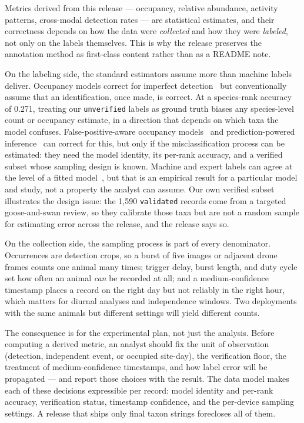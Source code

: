 \documentclass[sigconf]{acmart}
\begin{document}
Metrics derived from this release --- occupancy, relative abundance,
activity patterns, cross-modal detection rates --- are statistical
estimates, and their correctness depends on how the data were
\emph{collected} and how they were \emph{labeled}, not only on the
labels themselves. This is why the release preserves the annotation
method as first-class content rather than as a README note.

On the labeling side, the standard estimators assume more than machine
labels deliver. Occupancy models correct for imperfect
detection~\cite{mackenzie2002occupancy} but conventionally assume that
an identification, once made, is correct. At a species-rank accuracy of
0.271, treating our \texttt{unverified} labels as ground truth biases
any species-level count or occupancy estimate, in a direction that
depends on which taxa the model confuses. False-positive-aware occupancy
models~\cite{royle2006falsepositive,chambert2015falsepositive} and
prediction-powered inference~\cite{angelopoulos2023ppi} can correct
for this, but only if the misclassification process can be estimated:
they need the model identity, its per-rank accuracy, and a verified
subset whose sampling design is known. Machine and expert labels can
agree at the level of a fitted model~\cite{Thornton2026AI}, but that is
an empirical result for a particular model and study, not a property
the analyst can assume. Our own verified subset illustrates the design
issue: the 1{,}590 \texttt{validated} records come from a targeted
goose-and-swan review, so they calibrate those taxa but are not a random
sample for estimating error across the release, and the release says
so.

On the collection side, the sampling process is part of every
denominator. Occurrences are detection crops, so a burst of five images
or adjacent drone frames counts one animal many times; trigger delay,
burst length, and duty cycle set how often an animal \emph{can} be
recorded at all; and a medium-confidence timestamp places a record on
the right day but not reliably in the right hour, which matters for
diurnal analyses and independence windows. Two deployments with the
same animals but different settings will yield different counts.

The consequence is for the experimental plan, not just the analysis.
Before computing a derived metric, an analyst should fix the unit of
observation (detection, independent event, or occupied site-day), the
verification floor, the treatment of medium-confidence timestamps, and
how label error will be propagated --- and report those choices with the
result. The data model makes each of these decisions expressible per
record: model identity and per-rank accuracy, verification status,
timestamp confidence, and the per-device sampling settings. A release
that ships only final taxon strings forecloses all of them.
\end{document}
